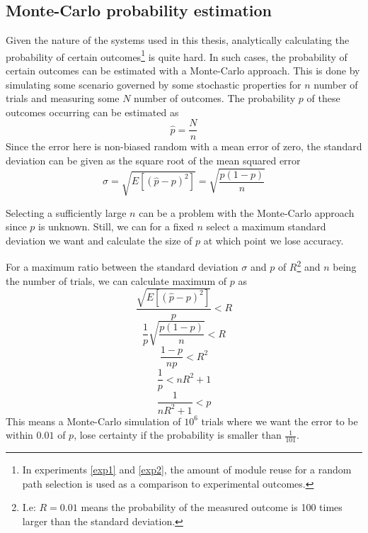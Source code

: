 \subsection{Monte-Carlo probability estimation}
\label{mc-estimate}
Given the nature of the systems used in this thesis, analytically calculating the probability of certain outcomes\footnote{In experiments \ref{exp1} and \ref{exp2}, the amount of module reuse for a random path selection is used as a comparison to experimental outcomes.} is quite hard. In such cases, the probability of certain outcomes can be estimated with a Monte-Carlo approach. This is done by simulating some scenario governed by some stochastic properties for \(n\) number of trials and measuring some \(N\) number of outcomes. The probability \(p\) of these outcomes occurring can be estimated as 
\begin{equation*}
    \hat{p}=\frac{N}{n}
\end{equation*}
Since the error here is non-biased random with a mean error of zero, the standard deviation can be given as the square root of the mean squared error 
\begin{equation*}
    \sigma=\sqrt{E[(\hat{p}-p)^{2}]} =\sqrt{\frac{p(1-p)}{n}}
\end{equation*}


Selecting a sufficiently large \(n\) can be a problem with the Monte-Carlo approach since \(p\) is unknown. Still, we can for a fixed \(n\) select a maximum standard deviation we want and calculate the size of \(p\) at which point we lose accuracy. 

For a maximum ratio between the standard deviation \(\sigma\) and \(p\) of \(R\)\footnote{I.e: \(R=0.01\) means the probability of the measured outcome is 100 times larger than the standard deviation.} and \(n\) being the number of trials, we can calculate maximum of \(p\) as
\begin{equation*}
    \frac{\sqrt{E[(\hat{p}-p)^{2}]}}{p} < R
\end{equation*}
\begin{equation*}
    \frac{1}{p}\sqrt{\frac{p(1-p)}{n}} < R
\end{equation*}
\begin{equation*}
    \frac{1-p}{np} < R^{2}
\end{equation*}
\begin{equation*}
    \frac{1}{p}< nR^{2}+1
\end{equation*}
\begin{equation}
    \frac{1}{nR^{2}+1}<p
    \label{eq:montecarloP}
\end{equation}
This means a Monte-Carlo simulation of \(10^{6}\) trials where we want the error to be within  \(0.01\) of \(p\), lose certainty if the probability is smaller than \(\frac{1}{101}\).

